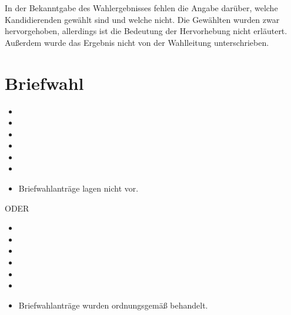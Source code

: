 \documentclass[a4paper]{scrartcl}
\newcommand{\fullcheck}{\raisebox{-.8\dp\strutbox}{\texttt{[image: Check.pdf]}}}
\newcommand{\semicheck}{\raisebox{-.8\dp\strutbox}{\texttt{[image: Semicheck.pdf]}}}
\newcommand{\nocheck}{\raisebox{-.8\dp\strutbox}{\texttt{[image: Nocheck.pdf]}}}
\newcommand{\dontknow}{\raisebox{-.8\dp\strutbox}{\texttt{[image: Dontknow.pdf]}}}
\newcommand{\notrev}{\raisebox{-.8\dp\strutbox}{\texttt{[image: Notrev.pdf]}}}
\newcommand{\sym}[1]{
\ifcase#1 \item[$\Box$]
\or \item[\fullcheck]
\or \item[\semicheck]
\or \item[\nocheck]
\or \item[\dontknow]
\or \item[\notrev]
\else \item[$\Box$]
\fi}
\begin{document}


In der Bekanntgabe des Wahlergebnisses fehlen die Angabe darüber, welche Kandidierenden gewählt sind und welche nicht. 
Die Gewählten wurden zwar hervorgehoben, allerdings ist die Bedeutung der Hervorhebung nicht erläutert.
Außerdem wurde das Ergebnis nicht von der Wahlleitung unterschrieben.








\section{Briefwahl}
\begin{itemize}[label=$\Box$]
\sym{1} Briefwahlanträge lagen nicht vor.
\end{itemize}

 ODER
 
\begin{itemize}[label=$\Box$]
\sym{0} Briefwahlanträge wurden ordnungsgemäß behandelt.
\end{itemize}



\end{document}
